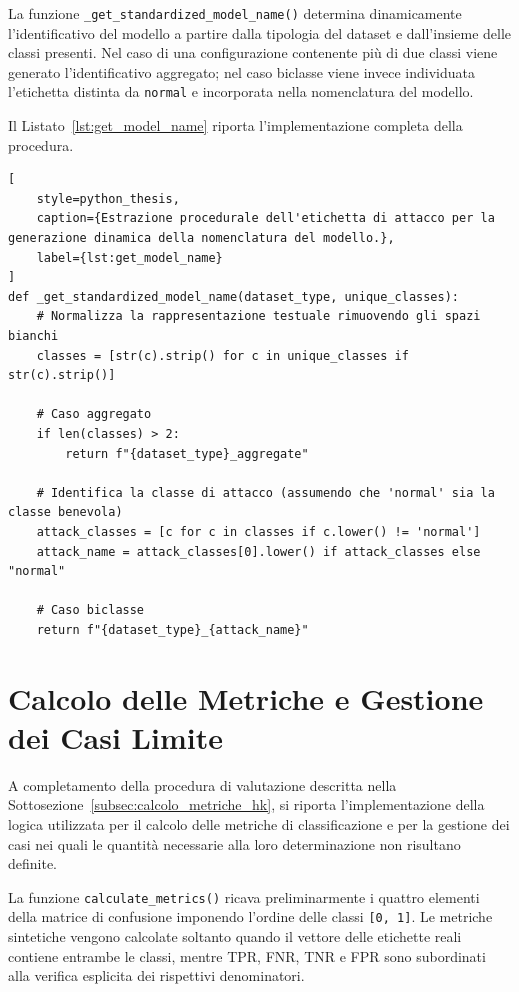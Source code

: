 La funzione \texttt{\_get\_standardized\_model\_name()} determina dinamicamente l'identificativo del modello a partire dalla tipologia del dataset e dall'insieme delle classi presenti. 
Nel caso di una configurazione contenente più di due classi viene generato l'identificativo aggregato; nel caso biclasse viene invece individuata l'etichetta distinta da \texttt{normal} e incorporata nella nomenclatura del modello.

Il Listato~\ref{lst:get_model_name} riporta l'implementazione completa della procedura.

\begin{lstlisting}[
    style=python_thesis,
    caption={Estrazione procedurale dell'etichetta di attacco per la generazione dinamica della nomenclatura del modello.},
    label={lst:get_model_name}
]
def _get_standardized_model_name(dataset_type, unique_classes):
    # Normalizza la rappresentazione testuale rimuovendo gli spazi bianchi
    classes = [str(c).strip() for c in unique_classes if str(c).strip()]

    # Caso aggregato
    if len(classes) > 2:
        return f"{dataset_type}_aggregate"
    
    # Identifica la classe di attacco (assumendo che 'normal' sia la classe benevola)
    attack_classes = [c for c in classes if c.lower() != 'normal']
    attack_name = attack_classes[0].lower() if attack_classes else "normal"
    
    # Caso biclasse
    return f"{dataset_type}_{attack_name}"
\end{lstlisting}



\section{Calcolo delle Metriche e Gestione dei Casi Limite}
\label{app:calcolo_metriche}

A completamento della procedura di valutazione descritta nella Sottosezione~\ref{subsec:calcolo_metriche_hk}, si riporta l'implementazione della logica utilizzata per il calcolo delle metriche di classificazione e per la gestione dei casi nei quali le quantità necessarie alla loro determinazione non risultano definite.

La funzione \texttt{calculate\_metrics()} ricava preliminarmente i quattro elementi della matrice di confusione imponendo l'ordine delle classi \texttt{[0, 1]}. 
Le metriche sintetiche vengono calcolate soltanto quando il vettore delle etichette reali contiene entrambe le classi, mentre TPR, FNR, TNR e FPR sono subordinati alla verifica esplicita dei rispettivi denominatori.

